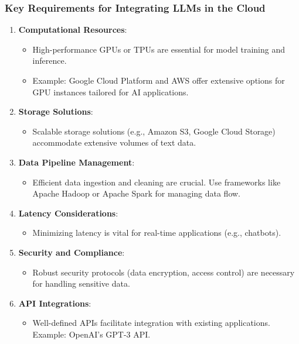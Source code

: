 \documentclass[aspectratio=169]{beamer}
\begin{document}
\begin{frame}[fragile]
    \frametitle{Key Requirements for Integrating LLMs in the Cloud}
    \begin{enumerate}
        \item \textbf{Computational Resources}:
            \begin{itemize}
                \item High-performance GPUs or TPUs are essential for model training and inference.
                \item Example: Google Cloud Platform and AWS offer extensive options for GPU instances tailored for AI applications.
            \end{itemize}
            
        \item \textbf{Storage Solutions}:
            \begin{itemize}
                \item Scalable storage solutions (e.g., Amazon S3, Google Cloud Storage) accommodate extensive volumes of text data.
            \end{itemize}

        \item \textbf{Data Pipeline Management}:
            \begin{itemize}
                \item Efficient data ingestion and cleaning are crucial. Use frameworks like Apache Hadoop or Apache Spark for managing data flow.
            \end{itemize}

        \item \textbf{Latency Considerations}:
            \begin{itemize}
                \item Minimizing latency is vital for real-time applications (e.g., chatbots).
            \end{itemize}

        \item \textbf{Security and Compliance}:
            \begin{itemize}
                \item Robust security protocols (data encryption, access control) are necessary for handling sensitive data.
            \end{itemize}

        \item \textbf{API Integrations}:
            \begin{itemize}
                \item Well-defined APIs facilitate integration with existing applications. Example: OpenAI's GPT-3 API.
            \end{itemize}
    \end{enumerate}
\end{frame}
\end{document}
